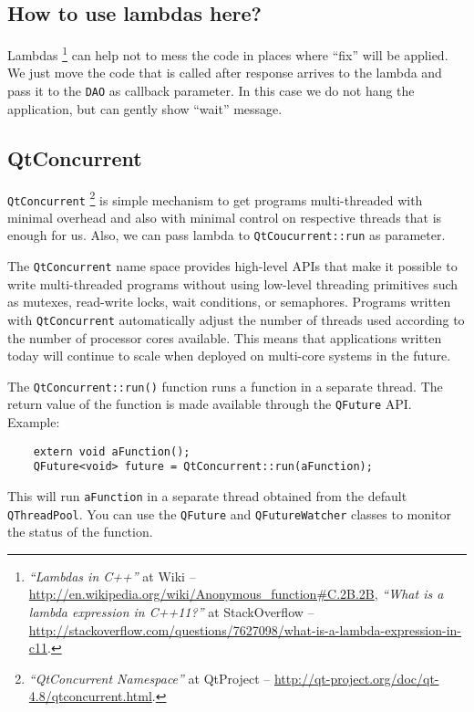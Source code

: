 \documentclass[a4paper,12pt]{scrartcl}
\begin{document}
\subsection{How to use lambdas here?}

Lambdas%
\footnote{\textit{``Lambdas in C++''} at Wiki --
\url{http://en.wikipedia.org/wiki/Anonymous\_function\#C.2B.2B},
\textit{``What is a lambda expression in C++11?''} at StackOverflow --
\url{http://stackoverflow.com/questions/7627098/what-is-a-lambda-expression-in-c11}.}
can help not to mess the code in places where ``fix'' will be applied. We just move the code that is called 
after response arrives to the lambda and pass it to the \texttt{DAO} as callback parameter. In this case we 
do not hang the application, but can gently show ``wait'' message.


\subsection{QtConcurrent}
\texttt{QtConcurrent}%
\footnote{\textit{``QtConcurrent Namespace''} at QtProject -- \url{http://qt-project.org/doc/qt-4.8/qtconcurrent.html}.}
is simple mechanism to get programs multi-threaded with minimal overhead and also with minimal control on 
respective threads that is enough for us. Also, we can pass lambda to \texttt{QtCoucurrent::run} as parameter.

The \texttt{QtConcurrent} name space provides high-level APIs that make it possible to write multi-threaded 
programs without using low-level threading primitives such as mutexes, read-write locks, wait conditions, or 
semaphores. Programs written with \texttt{QtConcurrent} automatically adjust the number of threads used 
according to the number of processor cores available. This means that applications written today will continue 
to scale when deployed on multi-core systems in the future.

The \texttt{QtConcurrent::run()} function runs a function in a separate thread. The return value of the function 
is made available through the \texttt{QFuture} API.
Example:

\begin{verbatim}
    extern void aFunction();
    QFuture<void> future = QtConcurrent::run(aFunction);
\end{verbatim}
    
This will run \texttt{aFunction} in a separate thread obtained from the default \texttt{QThreadPool}. You can use the 
\texttt{QFuture} and \texttt{QFutureWatcher} classes to monitor the status of the function.
\end{document}
